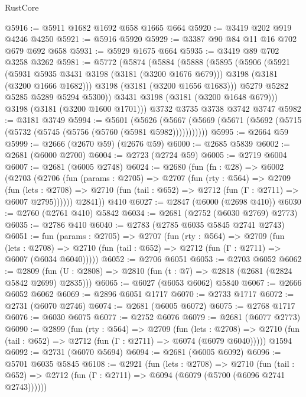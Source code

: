 \begin{lexlean}{RustCore}
\begin{coremodule}
@5916 := @5911 @1682 @1692 @658 @1665 @664
@5920 := @3419 @202 @919 @4246 @4250
@5921 := @5916 @5920
@5929 := @3387 @90 @84 @11 @16 @702 @679 @692 @658
@5931 := @5929 @1675 @664
@5935 := @3419 @89 @702 @3258 @3262
@5981 := @5772
    (@5874
      (@5884
        (@5888
          (@5895
            (@5906
              (@5921
                (@5931 @5935 @3431 @3198 (@3181 (@3200 @1676 @679)))
                @3198
                (@3181 (@3200 @1666 @1682)))
              @3198
              (@3181 (@3200 @1656 @1683)))
            @5279
            @5282
            @5285
            @5289
            @5294
            @5300))
        @3431
        @3198
        (@3181 (@3200 @1648 @679)))
      @3198
      (@3181 (@3200 @1600 @1701)))
    @3732
    @3735
    @3738
    @3742
    @3747
@5982 := @3181 @3749
@5994 := @5601
    (@5626 (@5667 (@5669 (@5671 (@5692 (@5715 (@5732 (@5745 (@5756 (@5760 (@5981 @5982)))))))))))
@5995 := @2664 @59
@5999 := @2666 (@2670 @59) (@2676 @59)
@6000 := @2685 @5839
@6002 := @2681 (@6000 @2700)
@6004 := @2723 (@2724 @59)
@6005 := @2719 @6004
@6007 := @2681 (@6005 @2748)
@6024 := @2680
    (fun (fn : @28) =>
    @6002
      (@2703
        (@2706
          (fun (params : @2705) =>
          @2707
            (fun (rty : @564) =>
            @2709
              (fun (lets : @2708) =>
              @2710 (fun (tail : @652) => @2712 (fun (Γ : @2711) => @6007 @2795))))))
        @2841))
    @410
@6027 := @2847 (@6000 (@2698 @410))
@6030 := @2760 (@2761 @410) @5842
@6034 := @2681 (@2752 (@6030 @2769) @2773)
@6035 := @2786 @410
@6040 := @2783 (@2785 @6035 @5845 @2741 @2743)
@6051 := fun (params : @2705) =>
  @2707
    (fun (rty : @564) =>
    @2709
      (fun (lets : @2708) =>
      @2710 (fun (tail : @652) => @2712 (fun (Γ : @2711) => @6007 (@6034 @6040)))))
@6052 := @2706 @6051
@6053 := @2703 @6052
@6062 := @2809 (fun (U : @2808) => @2810 (fun (t : @7) => @2818 (@2681 (@2824 @5842 @2699) @2835)))
@6065 := @6027 (@6053 @6062) @5840
@6067 := @2666 @6052 @6062
@6069 := @2896 @6051 @1717
@6070 := @2733 @1717
@6072 := @2731 (@6070 @2746)
@6074 := @2681 (@6005 @6072)
@6075 := @2768 @1717
@6076 := @6030 @6075
@6077 := @2752 @6076
@6079 := @2681 (@6077 @2773)
@6090 := @2899
    (fun (rty : @564) =>
    @2709
      (fun (lets : @2708) =>
      @2710 (fun (tail : @652) => @2712 (fun (Γ : @2711) => @6074 (@6079 @6040)))))
    @1594
@6092 := @2731 (@6070 @5694)
@6094 := @2681 (@6005 @6092)
@6096 := @5701 @6035 @5845
@6108 := @2921
    (fun (lets : @2708) =>
    @2710
      (fun (tail : @652) => @2712 (fun (Γ : @2711) => @6094 (@6079 (@5700 (@6096 @2741 @2743))))))

\end{coremodule}
\end{lexlean}
